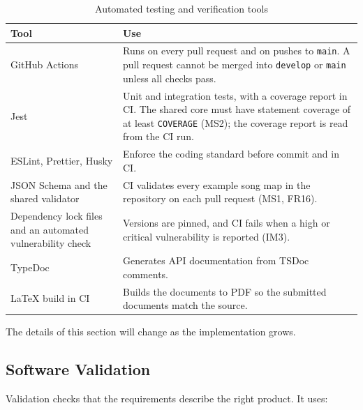 \documentclass[12pt, titlepage]{article}
\newcommand{\cn}[1]{\texttt{#1}}
\begin{document}
\begin{table}[h!]
\caption{Automated testing and verification tools} \label{TblTools}
\begin{tabularx}{\textwidth}{P{0.25\textwidth}X}
\toprule
\textbf{Tool} & \textbf{Use}\\
\midrule
GitHub Actions & Runs on every pull request and on pushes to \texttt{main}. A
pull request cannot be merged into \texttt{develop} or \texttt{main} unless all
checks pass.\\
Jest & Unit and integration tests, with a coverage report in CI. The shared core
must have statement coverage of at least \cn{COVERAGE} (MS2); the coverage
report is read from the CI run.\\
ESLint, Prettier, Husky & Enforce the coding standard before commit and in
CI.\\
JSON Schema and the shared validator & CI validates every example song map in
the repository on each pull request (MS1, FR16).\\
Dependency lock files and an automated vulnerability check & Versions are
pinned, and CI fails when a high or critical vulnerability is reported
(IM3).\\
TypeDoc & Generates API documentation from TSDoc comments.\\
\LaTeX{} build in CI & Builds the documents to PDF so the submitted documents
match the source.\\
\bottomrule
\end{tabularx}
\end{table}

The details of this section will change as the implementation grows.

\subsection{Software Validation} \label{SecValidation}

Validation checks that the requirements describe the right product. It uses:
\end{document}
